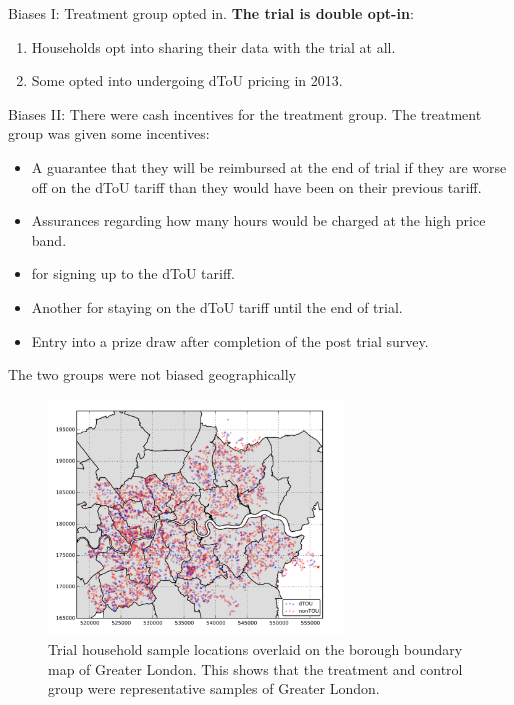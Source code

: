 \documentclass{beamer}
\begin{document}
\begin{frame}{Biases I: Treatment group opted in.}
  \textbf{The trial is double opt-in}:
  \begin{enumerate}
    \item<+-> Households opt into sharing their data with the trial at all.
    \item<+-> Some opted into undergoing dToU pricing in 2013.
  \end{enumerate}
\end{frame}

\begin{frame}{Biases II: There were cash incentives for the treatment group.}
  The treatment group was given some incentives: 
  \begin{itemize}
    \item A guarantee that they will be reimbursed at the end of trial if they are worse off on the dToU tariff than they would have been on their previous tariff.
    \item Assurances regarding how many hours would be charged at the high price band.
    \item {} for signing up to the dToU tariff.
    \item Another  for staying on the dToU tariff until the end of trial.
    \item Entry into a prize draw after completion of the post trial survey.
  \end{itemize}
\end{frame}

\begin{frame}{The two groups were not biased geographically}
  \begin{figure}
    \centering
      \includegraphics[width=0.7\textwidth]{images/london-geo-breakdown.png}
      \caption{Trial household sample locations overlaid on the borough boundary map of Greater London. This shows that the treatment and control group were representative samples of Greater London.}
  \end{figure}
\end{frame}
\end{document}
